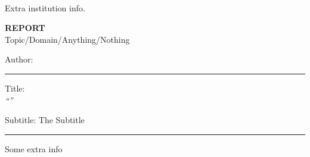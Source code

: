 \begin{titlingpage}
    \centering
    \vspace{10mm}
    \textbf{\Large \theinstitution{}}\\
    \vspace{5mm}

    {\large Extra institution info.} \\
    \vspace{5mm}

    {\large
        \thelaboratory{}
        \vfill

        \textbf{REPORT} \\
        Topic/Domain/Anything/Nothing

        \vfill
        Author: \textbf{\theauthor{}}\\
        \date
        \vfill

        \par\noindent\rule{\textwidth}{0.4pt}

            {\Large     Title: \\ 
                \emph{``\thetitle''}}

            \vspace{5mm}
            
            {\large Subtitle: The Subtitle}

        \par\noindent\rule{\textwidth}{0.4pt}

    }
    \vfill

    \begin{minipage}[b]{\textwidth}\normalsize\centering
        Some extra info
    \end{minipage}
    \vfill
\end{titlingpage}
